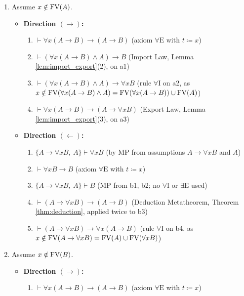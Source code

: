 \documentclass[10pt,a4paper]{article}
\begin{document}
\begin{enumerate}
\item Assume $x \notin {\textrm{FV}}(A)$.
  \begin{itemize}
  \item \textbf{Direction $(\to)$:}
    \begin{enumerate}
    \item[(a1)] $\vdash \forall x (A \to B) \to (A \to B)$ \hfill (axiom $\forall\textrm{E}$ with $t \coloneqq x$)
    \item[(a2)] $\vdash (\forall x (A \to B) \land A) \to B$ \hfill (Import Law, Lemma \ref{lem:import_export}(2), on a1)
    \item[(a3)] $\vdash (\forall x (A \to B) \land A) \to \forall x B$ \hfill (rule $\forall\textrm{I}$ on a2, as $x \notin {\textrm{FV}}(\forall x(A \to B) \land A) = {\textrm{FV}}(\forall x(A \to B)) \cup {\textrm{FV}}(A)$)
    \item[(a4)] $\vdash \forall x (A \to B) \to (A \to \forall x B)$ \hfill (Export Law, Lemma \ref{lem:import_export}(3), on a3)
    \end{enumerate}
  \item \textbf{Direction $(\leftarrow)$:}
    \begin{enumerate}
    \item[(b1)] $\{A \to \forall x B,\ A\} \vdash \forall x B$ \hfill (by $\textrm{MP}$ from assumptions $A \to \forall x B$ and $A$)
    \item[(b2)] $\vdash \forall x B \to B$ \hfill (axiom $\forall\textrm{E}$ with $t \coloneqq x$)
    \item[(b3)] $\{A \to \forall x B,\ A\} \vdash B$ \hfill ($\textrm{MP}$ from b1, b2; no $\forall\textrm{I}$ or $\exists\textrm{E}$ used)
    \item[(b4)] $\vdash (A \to \forall x B) \to (A \to B)$ \hfill (Deduction Metatheorem, Theorem \ref{thm:deduction}, applied twice to b3)
    \item[(b5)] $\vdash (A \to \forall x B) \to \forall x (A \to B)$ \hfill (rule $\forall\textrm{I}$ on b4, as $x \notin {\textrm{FV}}(A \to \forall x B) = {\textrm{FV}}(A) \cup {\textrm{FV}}(\forall x B)$)
    \end{enumerate}
  \end{itemize}
\item Assume $x \notin {\textrm{FV}}(B)$.
  \begin{itemize}
  \item \textbf{Direction $(\to)$:}
    \begin{enumerate}
    \item[(c1)] $\vdash \forall x (A \to B) \to (A \to B)$ \hfill (axiom $\forall\textrm{E}$ with $t \coloneqq x$)

\end{enumerate}
\end{itemize}
\end{enumerate}
\end{document}
